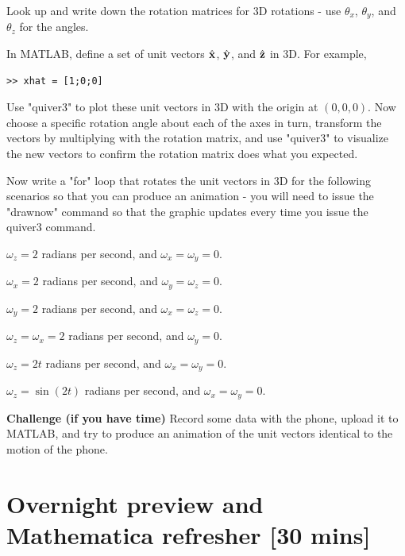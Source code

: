 \documentclass{tufte-handout}
\begin{document}
\be[resume=exercises, label=\textbf{Exercise} (\arabic*)]
\item Look up and write down the rotation matrices for 3D rotations - use $\theta_x$, $\theta_y$, and $\theta_z$ for the angles.
\item In MATLAB, define a set of unit vectors $\hat{\mathbf{x}}$, $\hat{\mathbf{y}}$, and $\hat{\mathbf{z}}$ in 3D. For example,
\begin{verbatim}
>> xhat = [1;0;0]
\end{verbatim}
Use "quiver3" to plot these unit vectors in 3D with the origin at $(0,0,0)$. Now choose a specific rotation angle about each of the axes in turn, transform the vectors by multiplying with the rotation matrix, and use "quiver3" to visualize the new vectors to confirm the rotation matrix does what you expected.
\item Now write a "for" loop that rotates the unit vectors in 3D for the following scenarios so that you can produce an animation - you will need to issue the "drawnow" command so that the graphic updates every time you issue the quiver3 command. 
\be
\item $\omega_z = 2$ radians per second, and $\omega_x=\omega_y=0$.
\item $\omega_x = 2$ radians per second, and $\omega_y=\omega_z=0$.
\item $\omega_y = 2$ radians per second, and $\omega_x=\omega_z=0$.
\item $\omega_z = \omega_x = 2$ radians per second, and $\omega_y=0$.
\item $\omega_z = 2t$ radians per second, and $\omega_x=\omega_y=0$.
\item $\omega_z = \sin(2 t)$ radians per second, and $\omega_x=\omega_y=0$. 
\ee
\item {\bf Challenge (if you have time)} Record some data with the phone, upload it to MATLAB, and try to produce an animation of the unit vectors identical to the motion of the phone. 
\ee


\section{Overnight preview and Mathematica refresher [30 mins]}
\end{document}

